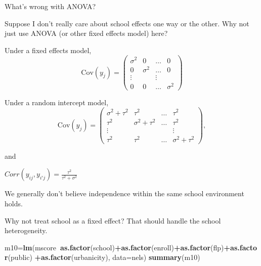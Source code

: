 \documentclass[ignorenonframetext,]{beamer}
\newenvironment{Shaded}{\begin{snugshade}}{\end{snugshade}}
\newcommand{\KeywordTok}[1]{\textcolor[rgb]{0.13,0.29,0.53}{\textbf{#1}}}
\newcommand{\DataTypeTok}[1]{\textcolor[rgb]{0.13,0.29,0.53}{#1}}
\newcommand{\OperatorTok}[1]{\textcolor[rgb]{0.81,0.36,0.00}{\textbf{#1}}}
\newcommand{\NormalTok}[1]{#1}
\begin{document}
\begin{frame}{What's wrong with ANOVA?}

Suppose I don't really care about school effects one way or the other.
Why not just use ANOVA (or other fixed effects model) here?

Under a fixed effects model,
\[\text{Cov}(y_j)=\begin{pmatrix} \sigma^2 & 0 & \ldots & 0 \\ 0 & \sigma^2 & \ldots & 0 \\ \vdots & & \vdots \\ 0 & 0 & \ldots & \sigma^2 \end{pmatrix}\]

\end{frame}

\begin{frame}{}

Under a random intercept model,
\[\text{Cov}(y_j)=\begin{pmatrix} \sigma^2 +\tau^2 & \tau^2 & \ldots & \tau^2 \\ \tau^2 & \sigma^2 + \tau^2 & \ldots & \tau^2 \\ \vdots & & & \vdots \\ \tau^2 & \tau^2 & \ldots & \sigma^2 + \tau^2 \end{pmatrix},\]

and

\(Corr(y_{ij},y_{i'j})=\frac{\tau^2}{\tau^2+\sigma^2}\)

We generally don't believe independence within the same school
environment holds.

\end{frame}

\begin{frame}[fragile]{}

Why not treat school as a fixed effect? That should handle the school
heterogeneity.

\begin{Shaded}
\begin{Highlighting}[]
\NormalTok{m10=}\KeywordTok{lm}\NormalTok{(mscore}\OperatorTok{~}\KeywordTok{as.factor}\NormalTok{(school)}\OperatorTok{+}\KeywordTok{as.factor}\NormalTok{(enroll)}\OperatorTok{+}\KeywordTok{as.factor}\NormalTok{(flp)}\OperatorTok{+}\KeywordTok{as.factor}\NormalTok{(public)}
       \OperatorTok{+}\KeywordTok{as.factor}\NormalTok{(urbanicity), }\DataTypeTok{data=}\NormalTok{nels)}
\KeywordTok{summary}\NormalTok{(m10)}
\end{Highlighting}
\end{Shaded}

\end{frame}
\end{document}
